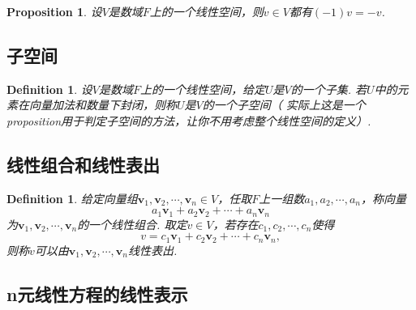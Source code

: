 \documentclass{article}
\newtheorem{proposition}[theorem]{Proposition}
\newtheorem{definition}[theorem]{Definition}
\newcommand{\mbf}[1]{\bm{#1}}
\begin{document}
\begin{proposition}
\rm 设$V$是数域$F$上的一个线性空间，则$v \in V$都有$(-1)v=-v$.
\end{proposition}

\subsection{子空间}

\begin{definition}
\rm 设$V$是数域$F$上的一个线性空间，给定$U$是$V$的一个子集. 若$U$中的元素在向量加法和数量下封闭，则称$U$是$V$的一个子空间（{\color{blue} 实际上这是一个proposition用于判定子空间的方法，让你不用考虑整个线性空间的定义}）.
\end{definition}

\subsection{线性组合和线性表出}

\begin{definition}
\rm 给定向量组$\mbf{v}_1,\mbf{v}_2,\cdots,\mbf{v}_n \in V$，任取$F$上一组数$a_1,a_2,\cdots,a_n$，称向量
$$
a_1\mbf{v}_1 + a_2\mbf{v}_2 + \cdots + a_n\mbf{v}_n
$$
为$\mbf{v}_1,\mbf{v}_2,\cdots,\mbf{v}_n$的一个线性组合. 取定$v \in V$，若存在$c_1,c_2,\cdots,c_n$使得
$$
v = c_1\mbf{v}_1 + c_2\mbf{v}_2 + \cdots + c_n\mbf{v}_n,
$$
则称$v$可以由$\mbf{v}_1,\mbf{v}_2,\cdots,\mbf{v}_n$线性表出. 
\end{definition}


\subsection{n元线性方程的线性表示}
\end{document}
